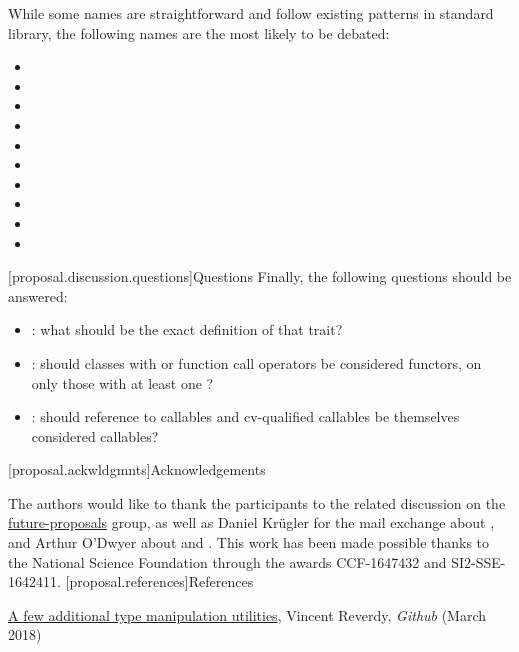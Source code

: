 \documentclass[ebook,10pt,oneside,openany,final]{memoir}
\begin{document}
While some names are straightforward and follow existing patterns in standard library, the following names are the most likely to be debated:
\begin{itemize}
\item {}
\item {}
\item {}
\item {}
\item {}
\item {}
\item {}
\item {}
\item {}
\item {}
\end{itemize}
[proposal.discussion.questions]{Questions}
Finally, the following questions should be answered:
\begin{itemize}
\item {}: what should be the exact definition of that trait?
\item {}: should classes with  or  function call operators be considered functors, on only those with at least one  ?
\item {}: should reference to callables and cv-qualified callables be themselves considered callables?
\end{itemize}
[proposal.ackwldgmnts]{Acknowledgements}

The authors would like to thank the participants to the related discussion on the \href{https://groups.google.com/a/isocpp.org/forum/#!topic/std-proposals/R04CWOjABIQ}{future-proposals} group, as well as Daniel Kr\"ugler for the mail exchange about , and Arthur O'Dwyer about  and . This work has been made possible thanks to the National Science Foundation through the awards CCF-1647432 and SI2-SSE-1642411.
[proposal.references]{References}

\href{https://github.com/vreverdy/type-utilities}{A few additional type manipulation utilities}, Vincent Reverdy, \emph{Github} (March 2018)
\end{document}
